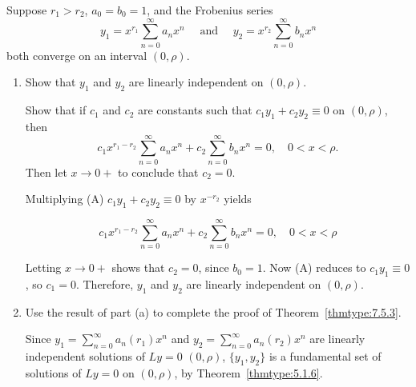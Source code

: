 \documentclass{ximera}
\begin{document}
\begin{problem}\label{exer:7.5.52} 
Suppose $r_1>r_2$, $a_0=b_0=1$, and the
Frobenius series
$$
y_1=x^{r_1}\sum_{n=0}^\infty a_nx^n\quad\mbox{ and }
\quad y_2=x^{r_2}\sum_{n=0}^\infty b_nx^n
$$
both converge on an interval $(0,\rho)$.

\begin{enumerate}
\item %
Show that $y_1$ and $y_2$
are linearly independent on $(0,\rho)$. 
    \begin{hint}
    Show that if $c_1$ and
$c_2$
are constants such that $c_1y_1+c_2y_2\equiv0$ on $(0,\rho)$, then
$$
c_1x^{r_1-r_2}\sum_{n=0}^\infty a_nx^n+
c_2\sum_{n=0}^\infty b_nx^n=0,\quad 0<x<\rho.
$$
Then let $x\to0+$ to conclude that $c_2=0$.
    \end{hint}

\begin{solution}
    Multiplying (A) $c_1y_1+c_2y_2\equiv 0$ by $x^{-r_2}$ yields
    
$$c_1x^{r_1-r_2}\sum_{n=0}^\infty a_nx^n+
c_2\sum_{n=0}^\infty b_nx^n=0,\quad 0<x<\rho$$

Letting $x\to0+$ shows that $c_2=0$, since $b_0=1$. Now (A)
reduces to $c_1y_1\equiv0$, so $c_1=0$. Therefore, $y_1$
and $y_2$ are linearly independent on $(0,\rho)$.
\end{solution}

\item %
 Use the  result of part (a) to
complete the proof of Theorem~\ref{thmtype:7.5.3}.

\begin{solution}
    Since
$y_1=\sum_{n=0}^\infty a_n(r_1)x^n$ and
$y_2=\sum_{n=0}^\infty a_n(r_2)x^n$ are linearly independent solutions
of $Ly=0$  $(0,\rho)$, $\{y_1,y_2\}$ is a fundamental
set of solutions of $Ly=0$ on $(0,\rho)$, by Theorem~\ref{thmtype:5.1.6}.
\end{solution}
\end{enumerate}
\end{problem}
\end{document}
